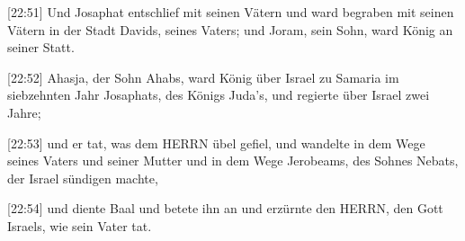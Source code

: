  {[}22:51{]} Und Josaphat entschlief mit seinen Vätern und
ward begraben mit seinen Vätern in der Stadt Davids, seines Vaters; und
Joram, sein Sohn, ward König an seiner Statt.

 {[}22:52{]} Ahasja, der Sohn Ahabs, ward König über Israel
zu Samaria im siebzehnten Jahr Josaphats, des Königs Juda's, und
regierte über Israel zwei Jahre;

 {[}22:53{]} und er tat, was dem HERRN übel gefiel, und
wandelte in dem Wege seines Vaters und seiner Mutter und in dem Wege
Jerobeams, des Sohnes Nebats, der Israel sündigen machte,

 {[}22:54{]} und diente Baal und betete ihn an und erzürnte
den HERRN, den Gott Israels, wie sein Vater tat.
